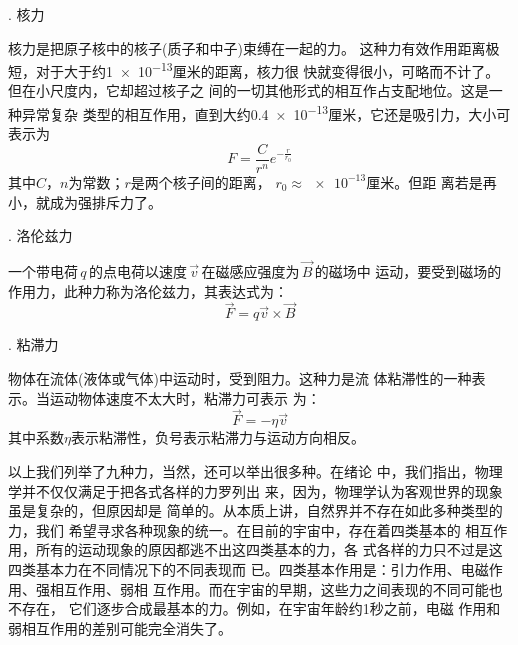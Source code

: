 . 核力 \normalfont

核力是把原子核中的核子(质子和中子)束缚在一起的力。
这种力有效作用距离极短，对于大于约\num{1e-13}厘米的距离，核力很
快就变得很小，可略而不计了。但在小尺度内，它却超过核子之
间的一切其他形式的相互作占支配地位。这是一种异常复杂
类型的相互作用，直到大约\num{0.4e-13}厘米，它还是吸引力，大小可表示为
\begin{equation}\label{eqn:03.04.06}
    F = \frac { C } { r ^ { n } } e ^ { - \frac { r } { r_0 } }
\end{equation}
其中$ C $，$ n $为常数；$ r $是两个核子间的距离， $ r _ { 0 } \approx \num{e-13} $厘米。但距
离若是再小，就成为强排斥力了。

. 洛伦兹力 \normalfont

一个带电荷\,$ q $\,的点电荷以速度\,$\vec{v}$\,在磁感应强度为\,$\vec{B}$\,的磁场中
运动，要受到磁场的作用力，此种力称为洛伦兹力，其表达式为：
\begin{equation}\label{eqn:03.04.07}
    \vec{F} = q \vec{v} \times \vec{B}
\end{equation}

. 粘滞力 \normalfont

物体在流体(液体或气体)中运动时，受到阻力。这种力是流
体粘滞性的一种表示。当运动物体速度不太大时，粘滞力可表示
为：\vspace{-1em}
\begin{equation}\label{eqn:03.04.08}
    \vec{F} = - \eta \vec{v}
\end{equation}
其中系数$\eta$表示粘滞性，负号表示粘滞力与运动方向相反。

以上我们列举了九种力，当然，还可以举出很多种。在绪论
中，我们指出，物理学并不仅仅满足于把各式各样的力罗列出
来，因为，物理学认为客观世界的现象虽是复杂的，但原因却是
简单的。从本质上讲，自然界并不存在如此多种类型的力，我们
希望寻求各种现象的统一。在目前的宇宙中，存在着四类基本的
相互作用，所有的运动现象的原因都逃不出这四类基本的力，各
式各样的力只不过是这四类基本力在不同情况下的不同表现而
已。四类基本作用是：引力作用、电磁作用、强相互作用、弱相
互作用。而在宇宙的早期，这些力之间表现的不同可能也不存在，
它们逐步合成最基本的力。例如，在宇宙年龄约1秒之前，电磁
作用和弱相互作用的差别可能完全消失了。



